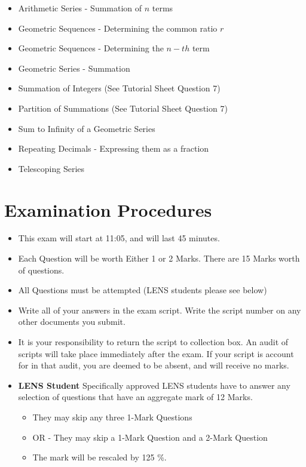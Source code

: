 \documentclass[]{article}
\begin{document}
\begin{itemize}
	\item Arithmetic Series - Summation of $n$ terms
	\item Geometric Sequences - Determining the common ratio $r$
	\item Geometric Sequences - Determining the $n-th$ term
	\item Geometric Series - Summation
	\item Summation of Integers (See Tutorial Sheet Question 7)
	\item Partition of Summations (See Tutorial Sheet Question 7)
	\item Sum to Infinity of a Geometric Series
	\item Repeating Decimals - Expressing them as a fraction
	\item Telescoping Series
\end{itemize}

\newpage
\section*{Examination Procedures}

\begin{itemize} 
\item This exam will start at 11:05, and will last 45 minutes.

\item Each Question will be worth Either 1 or 2 Marks. There are 15 Marks worth of questions.
\item All Questions must be attempted (LENS students please see below)

\item Write all of your answers in the exam script. Write the script number on any other documents you submit.

\item It is your responsibility to return the script to collection box. An audit of scripts will take place immediately after the exam. If your script is account for in that audit,  you are deemed to be absent, and will receive no marks.

\item \textbf{LENS Student}
Specifically approved LENS students have to answer any selection of questions that have an aggregate mark of 12 Marks.  
\begin{itemize}
\item They may skip any three 1-Mark Questions
\item OR - They may skip a 1-Mark Question and a 2-Mark Question
\item The mark will be rescaled by 125 \%.
\end{itemize}


\end{itemize}
\end{document}
